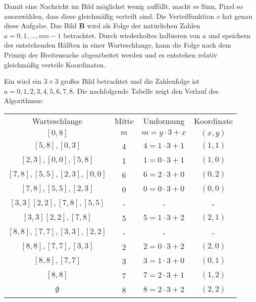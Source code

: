 Damit eine Nachricht im Bild möglichst wenig auffällt, macht es Sinn, Pixel
so auszuwählen, dass diese gleichmäßig verteilt sind. Die Verteilfunktion $v$ hat genau diese
Aufgabe. Das Bild $\mathbf{B}$ wird als Folge der natürlichen Zahlen
$a = 0,1,\ldots,mn - 1$ betrachtet. Durch wiederholtes halbieren von $a$ und
speichern der entstehenden Hälften in einer Warteschlange, kann die Folge nach
dem Prinzip der Breitensuche abgearbeitet werden und es entstehen relativ gleichmäßig
verteile Koordinaten.
\begin{example}
  Ein wird ein $3 \times 3$ großes Bild betrachtet und die Zahlenfolge ist
  $a = 0,1,2,3,4,5,6,7,8$. Die nachfolgende Tabelle zeigt den Verlauf des Algorithmus:
  \begin{center}
    \begin{tabular}{cccc}
      \multicolumn{1}{c}{Warteschlange} & Mitte & Umformung           & Koordinate \\
      $[0,8]$                           & $m$   & $m = y \cdot 3 + x$ & $(x,y)$    \\
      $[5,8],[0,3]$                     & 4     & $4 = 1 \cdot 3 + 1$ & $(1,1)$    \\
      $[2,3],[0,0],[5,8]$               & 1     & $1 = 0 \cdot 3 + 1$ & $(1,0)$    \\
      $[7,8],[5,5],[2,3],[0,0]$         & 6     & $6 = 2 \cdot 3 + 0$ & $(0,2)$    \\
      $[7,8],[5,5],[2,3]$               & 0     & $0 = 0 \cdot 3 + 0$ & $(0,0)$    \\
      $[3,3][2,2],[7,8],[5,5]$          & -     & -                   & -          \\
      $[3,3][2,2],[7,8]$                & 5     & $5 = 1 \cdot 3 + 2$ & $(2,1)$    \\
      $[8,8],[7,7],[3,3],[2,2]$         & -     & -                   & -          \\
      $[8,8],[7,7],[3,3]$               & 2     & $2 = 0 \cdot 3 + 2$ & $(2,0)$    \\
      $[8,8],[7,7]$                     & 3     & $3 = 1 \cdot 3 + 0$ & $(0,1)$    \\
      $[8,8]$                           & 7     & $7 = 2 \cdot 3 + 1$ & $(1,2)$    \\
      $\emptyset$                       & 8     & $8 = 2 \cdot 3 + 2$ & $(2,2)$
    \end{tabular}
  \end{center}
\end{example}
